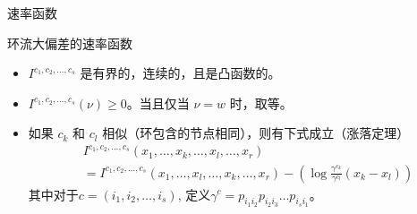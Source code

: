 \documentclass{beamer}
\begin{document}
	\begin{frame}{速率函数}
		\begin{block}{环流大偏差的速率函数}
			\begin{itemize}
				\item $\mathit{I}^{c_1, c_2, \dots, c_s}$ 是有界的，连续的，且是凸函数的。
				\item $\mathit{I}^{c_1, c_2, \dots, c_s}(\nu) \ge 0$。当且仅当 $\nu = w$ 时，取等。
				\item 如果 $c_k$ 和 $c_l$ 相似（环包含的节点相同），则有下式成立（涨落定理）
				\begin{align*}
					&\mathit{I}^{c_1, c_2, \dots, c_s}(x_1, \dots, x_k, \dots, x_l, \dots, x_r) \\
					&= \mathit{I}^{c_1, c_2, \dots, c_s}(x_1, \dots, x_l, \dots, x_k, \dots, x_r) - (\log \frac{\gamma^{c_k}}{\gamma^{c_l}} (x_k - x_l))
				\end{align*}
				其中对于$c = (i_1, i_2, \dots, i_s)$, 定义$\gamma^c = p_{i_1 i_2} p_{i_2 i_3} \dots p_{i_s i_1}$。
			\end{itemize}
		\end{block}
	\end{frame}


\end{document}
